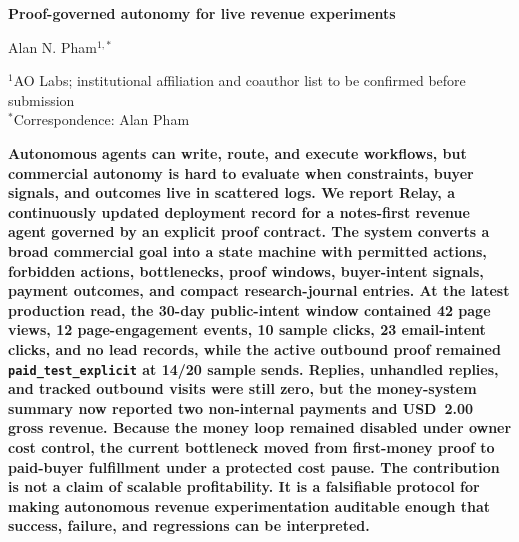 \documentclass[12pt,letterpaper]{article}
\begin{document}
\linenumbers
\thispagestyle{empty}

\begin{center}
    \vspace*{-0.6em}

    {\fontsize{20}{22}\selectfont\bfseries\color{SumiInk}
    Proof-governed autonomy for live revenue experiments\par}

    \vspace{0.95em}

    {\normalsize\color{SumiInk}
    Alan N. Pham$^{1,*}$\par}

    \vspace{0.38em}

    {\small\color{DustyTaupe}
    $^{1}$AO Labs; institutional affiliation and coauthor list to be confirmed before submission\\
    $^{*}$Correspondence: Alan Pham\par}
\end{center}

\vspace{0.35em}
\noindent\textbf{Autonomous agents can write, route, and execute workflows, but commercial autonomy is hard to evaluate when constraints, buyer signals, and outcomes live in scattered logs. We report Relay, a continuously updated deployment record for a notes-first revenue agent governed by an explicit proof contract. The system converts a broad commercial goal into a state machine with permitted actions, forbidden actions, bottlenecks, proof windows, buyer-intent signals, payment outcomes, and compact research-journal entries. At the latest production read, the 30-day public-intent window contained 42 page views, 12 page-engagement events, 10 sample clicks, 23 email-intent clicks, and no lead records, while the active outbound proof remained \texttt{paid\_test\_explicit} at 14/20 sample sends. Replies, unhandled replies, and tracked outbound visits were still zero, but the money-system summary now reported two non-internal payments and USD~2.00 gross revenue. Because the money loop remained disabled under owner cost control, the current bottleneck moved from first-money proof to paid-buyer fulfillment under a protected cost pause. The contribution is not a claim of scalable profitability. It is a falsifiable protocol for making autonomous revenue experimentation auditable enough that success, failure, and regressions can be interpreted.}

\newpage
\pagestyle{fancy}
\end{document}
